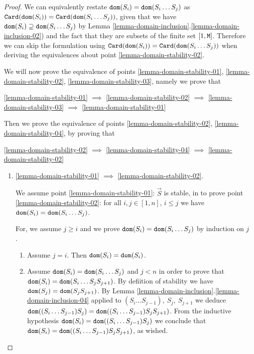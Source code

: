 \documentclass{lmcs}
\begin{document}
\begin{proof}
We can equivalently restate ${\tt dom}(S_i) =  {\tt dom}(S_i \ldots S_j)$ as
${\tt Card}({\tt dom}(S_i)) =  {\tt Card}({\tt dom}(S_i \ldots S_j))$, 
given that we have ${\tt dom}(S_i) \supseteq  {\tt dom}(S_i \ldots S_j)$ 
by Lemma \ref{lemma-domain-inclusion}.\ref{lemma-domain-inclusion-02})
and the fact that they are subsets of the finite set $[1,{\tt M}]$.
Therefore we can skip the formulation using 
${\tt Card}({\tt dom}(S_i)) =  {\tt Card}({\tt dom}(S_i \ldots S_j))$
when deriving the equivalences about point \ref{lemma-domain-stability-02}.

We will now prove the equivalence of points 
\ref{lemma-domain-stability-01},
\ref{lemma-domain-stability-02},
\ref{lemma-domain-stability-03},
namely we prove that
\begin{center}
\ref{lemma-domain-stability-01} 
$\implies$ 
\ref{lemma-domain-stability-02}
$\implies$ 
\ref{lemma-domain-stability-03} 
$\implies$ 
\ref{lemma-domain-stability-01}
\end{center}
Then we prove the equivalence of points
\ref{lemma-domain-stability-02},
\ref{lemma-domain-stability-04},
by proving that 
\begin{center}
\ref{lemma-domain-stability-02} $\implies$  
\ref{lemma-domain-stability-04} $\implies$  
\ref{lemma-domain-stability-02}
\end{center}


\begin{enumerate}

\item
\ref{lemma-domain-stability-01} $\implies$ \ref{lemma-domain-stability-02}.

We assume point \ref{lemma-domain-stability-01}: $\vec{S}$ is stable, in to prove 
point \ref{lemma-domain-stability-02}: 
for all $i, j \in [1, n]$, $i \le j$ we have ${\tt dom}(S_i) =  {\tt dom}(S_i \ldots S_j)$.

For, we assume $j \ge i$ and we prove ${\tt dom}(S_i) =  {\tt dom}(S_i \ldots S_j)$ by induction on $j$.
\begin{enumerate}
\item
Assume $j=i$. Then ${\tt dom}(S_i) =  {\tt dom}(S_i)$.
\item
Assume ${\tt dom}(S_i) =  {\tt dom}(S_i \ldots S_j)$ and $j<n$ in order to prove that 
${\tt dom}(S_i) =  {\tt dom}(S_i \ldots S_j S_{j+1})$. By defiition of stability we have 
${\tt dom}(S_j) = {\tt dom}(S_j S_{j+1})$. By Lemma 
\ref{lemma-domain-inclusion}.\ref{lemma-domain-inclusion-04} 
applied to $(S_i \ldots S_{j-1}), \ S_j, \ S_{j+1}$ we deduce 
${\tt dom}( (S_i \ldots S_{j-1}) S_j) = {\tt dom}( (S_i \ldots S_{j-1}) S_j S_{j+1})$.
From the inductive hypothesis ${\tt dom}(S_i) =  {\tt dom}( (S_i \ldots S_{j-1}) S_j)$
we conclude that ${\tt dom}(S_i) =  {\tt dom}((S_i \ldots S_{j-1}) S_j S_{j+1})$, as wished.
\end{enumerate}



\end{enumerate}
\end{proof}
\end{document}
